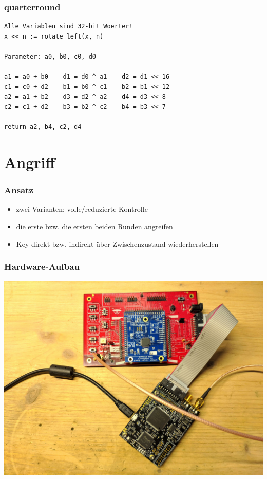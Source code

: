 \documentclass[ngerman]{beamer}
\begin{document}
\begin{frame}[fragile]

    \frametitle{quarterround}


    \begin{lstlisting}[]
Alle Variablen sind 32-bit Woerter!
x << n := rotate_left(x, n)

Parameter: a0, b0, c0, d0

a1 = a0 + b0    d1 = d0 ^ a1    d2 = d1 << 16
c1 = c0 + d2    b1 = b0 ^ c1    b2 = b1 << 12
a2 = a1 + b2    d3 = d2 ^ a2    d4 = d3 << 8
c2 = c1 + d2    b3 = b2 ^ c2    b4 = b3 << 7

return a2, b4, c2, d4
    \end{lstlisting}


\end{frame}



\section{Angriff}

\begin{frame}

    \frametitle{Ansatz}


    \begin{itemize}
        \item zwei Varianten: volle/reduzierte Kontrolle
        \item die erste bzw. die ersten beiden Runden angreifen
        \item Key direkt bzw. indirekt über Zwischenzustand wiederherstellen
    \end{itemize}

\end{frame}



\begin{frame}

    \frametitle{Hardware-Aufbau}


    \centering
    \includegraphics[width=0.8\linewidth]{img/hw_setup.jpg}

\end{frame}
\end{document}
